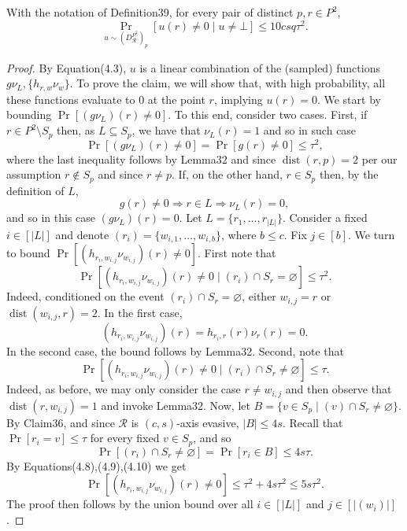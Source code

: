 \begin{ntclaim}
With the notation of Definition39, for every pair of distinct $p,r\in P^2$,
\[\Pr_{u\sim(D_{\mathcal R}^{P^2})_p}[u(r)\ne0\mid u\ne\bot]\leq10csq\tau^2.\]
\end{ntclaim}
\begin{proof}
By Equation(4.3), $u$ is a linear combination of the (sampled) functions $g\nu_L,\{h_{r,w}\nu_w\}$. To prove the claim, we will show that, with high probability, all these functions evaluate to $0$ at the point $r$, implying $u(r)=0$. We start by bounding $\Pr[(g\nu_L)(r)\ne0]$. To this end, consider two cases. First, if $r\in P^2\setminus S_p$ then, as $L\subseteq S_p$, we have that $\nu_L(r)=1$ and so in such case
\begin{equation}\Pr[(g\nu_L)(r)\ne0]=\Pr[g(r)\ne0]\leq\tau^2,\tag{4.7}\end{equation}
where the last inequality follows by Lemma32 and since $\operatorname{dist}(r,p)=2$ per our assumption $r\notin S_p$ and since $r\ne p$. If, on the other hand, $r\in S_p$ then, by the definition of $L$,
\[g(r)\ne0\Longrightarrow r\in L\Longrightarrow\nu_L(r)=0,\]
and so in this case $(g\nu_L)(r)=0$.
Let $L=\{r_1,\ldots,r_{|L|}\}$. Consider a fixed $i\in[|L|]$ and denote $(r_i)=\{w_{i,1},\ldots,w_{i,b}\}$, where $b\leq c$. Fix $j\in[b]$. We turn to bound $\Pr[(h_{r_i,w_{i,j}}\nu_{w_{i,j}})(r)\ne0]$. First note that
\begin{equation}\Pr[(h_{r_i,w_{i,j}}\nu_{w_{i,j}})(r)\ne0\mid(r_i)\cap S_r=\varnothing]\leq\tau^2.\tag{4.8}\end{equation}
Indeed, conditioned on the event $(r_i)\cap S_r=\varnothing$, either $w_{i,j}=r$ or $\operatorname{dist}(w_{i,j},r)=2$. In the first case,
\[(h_{r_i,w_{i,j}}\nu_{w_{i,j}})(r)=h_{r_i,r}(r)\nu_r(r)=0.\]
In the second case, the bound follows by Lemma32. Second, note that
\begin{equation}\Pr[(h_{r_i,w_{i,j}}\nu_{w_{i,j}})(r)\ne0\mid(r_i)\cap S_r\ne\varnothing]\leq\tau.\tag{4.9}\end{equation}
Indeed, as before, we may only consider the case $r\ne w_{i,j}$ and then observe that $\operatorname{dist}(r,w_{i,j})=1$ and invoke Lemma32. Now, let $B=\{v\in S_p\mid(v)\cap S_r\ne\varnothing\}$. By Claim36, and since $\mathcal R$ is $(c,s)$-axis evasive, $|B|\leq4s$. Recall that $\Pr[r_i=v]\leq\tau$ for every fixed $v\in S_p$, and so
\begin{equation}\Pr[(r_i)\cap S_r\ne\varnothing]=\Pr[r_i\in B]\leq4s\tau.\tag{4.10}\end{equation}
By Equations(4.8),(4.9),(4.10) we get
\[\Pr[(h_{r_i,w_{i,j}}\nu_{w_{i,j}})(r)\ne0]\leq\tau^2+4s\tau^2\leq5s\tau^2.\]
The proof then follows by the union bound over all $i\in[|L|]$ and $j\in[|(w_i)|]$.
\end{proof}
